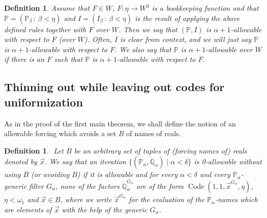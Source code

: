 \documentclass[a4paper,11pt]{article}
\newtheorem{definition}[theorem]{Definition}
\newcommand{\forceP}{\mathbb{P}}
\newcommand{\forceQ}{\mathbb{Q}}
\begin{document}
\begin{definition}
Assume that $F \in W$, $F: \eta \rightarrow W^3$ is a bookkeeping function and that $\forceP=(\forceP_{\beta} \, : \, \beta < \eta)$ and $I=(I_{\beta} \, : \, \beta < \eta)$ is the result of applying the above defined rules together with $F$ over $W$. Then we say that $(\forceP,I)$ is $\alpha+1$-allowable with respect to $F$ (over $W$). Often, $I$ is clear from context, and we will just say $\forceP$ is $\alpha+1$-allowable with respect to $F$. We also say that $\forceP$ is $\alpha+1$-allowable over $W$ if there is an $F$ such that $\forceP$ is $\alpha+1$-allowable with respect to $F$.
\end{definition}

\subsection{Thinning out while leaving out codes for uniformization}
As in the proof of the first main theorem, we shall define the notion of an allowable forcing which avoids a set $B$ of names of reals. 
\begin{definition}
    ﻿
    Let $B$ be an arbitrary set of  tuples of (forcing names of) reals denoted by $\vec{x}$.  We say that an iteration $\{ (\forceP_{\alpha},\dot{\forceQ}_{\alpha}) \mid \alpha < \delta \}$  is 0-allowable without  using $B$ (or avoiding $B$) if it is allowable and for every $\alpha< \delta$ and every $\forceP_{\alpha}
$-generic filter $G_{\alpha}$, none of the factors $\dot{\forceQ}_{\alpha}^{G_{\alpha}}$ are of the form $\operatorname{Code} (1,1,\vec{x}^{G_{\alpha}}, \eta)$, $\eta < \omega_1$ and $\vec{x} \in B$, where we write $\vec{x}^{G_{\alpha}}$ for the evaluation of the $\forceP_{\alpha}$-names which are elements of $\vec{x}$ with the help of the generic $G_{\alpha}$. 
    ﻿
    \end{definition}
\end{document}
